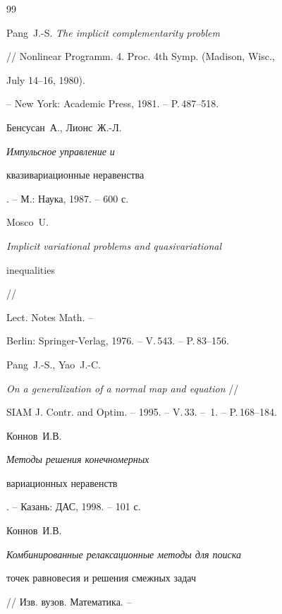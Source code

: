 \begin{thebibliography}{99}


Pang~J.-S. {\em The implicit complementarity problem}


// Nonlinear Programm. 4. Proc. 4th Symp. (Madison, Wisc.,


July 14--16, 1980).






-- New York: Academic Press, 1981. -- P.\,487--518.







Бенсусан~А., Лионс~Ж.-Л. {\em Импульсное управление и 


квазивариационные неравенства}. -- М.: Наука, 1987. -- 600 с.







Mosco~U. {\em Implicit variational problems and quasivariational


inequalities} //




Lect. Notes Math. -- 




Berlin: Springer-Verlag, 1976. -- V.\,543. -- P.\,83--156.







Pang~J.-S., Yao~J.-C.


{\em On a generalization of a normal map and equation} // 


SIAM J. Contr. and Optim. -- 1995. -- V.\,33. -- \No\,1. -- P.\,168--184.







Коннов~И.В. {\em Методы решения конечномерных


вариационных неравенств}. -- Казань: ДАС, 1998. -- 101 с.







Коннов~И.В. {\em Комбинированные релаксационные методы для поиска


точек равновесия и решения смежных задач} // Изв. вузов. Математика. --



\end{thebibliography}
